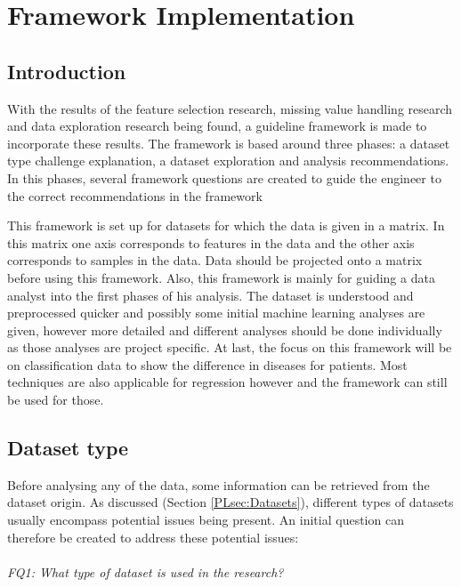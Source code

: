 \documentclass[10pt,a4paper]{report}
\begin{document}
	\chapter{Framework Implementation}
	\label{chap:FrameworkImplementation}
	
	\section{Introduction}
	\label{FIsec:Introduction}
	
	With the results of the feature selection research, missing value handling research and data exploration research being found, a guideline framework is made to incorporate these results. The framework is based around three phases: a dataset type challenge explanation, a dataset exploration and analysis recommendations. In this phases, several framework questions are created to guide the engineer to the correct recommendations in the framework
	
	This framework is set up for datasets for which the data is given in a matrix. In this matrix one axis corresponds to features in the data and the other axis corresponds to samples in the data. Data should be projected onto a matrix before using this framework. Also, this framework is mainly for guiding a data analyst into the first phases of his analysis. The dataset is understood and preprocessed quicker and possibly some initial machine learning analyses are given, however more detailed and different analyses should be done individually as those analyses are project specific. At last, the focus on this framework will be on classification data to show the difference in diseases for patients. Most techniques are also applicable for regression however and the framework can still be used for those.
	
	\section{Dataset type}
	\label{FIsec:DatasetType}
	
	Before analysing any of the data, some information can be retrieved from the dataset origin. As discussed (Section \ref{PLsec:Datasets}), different types of datasets usually encompass potential issues being present. An initial question can therefore be created to address these potential issues: \\
	\\
	\emph{FQ1: What type of dataset is used in the research?} \\
	\\
\end{document}
